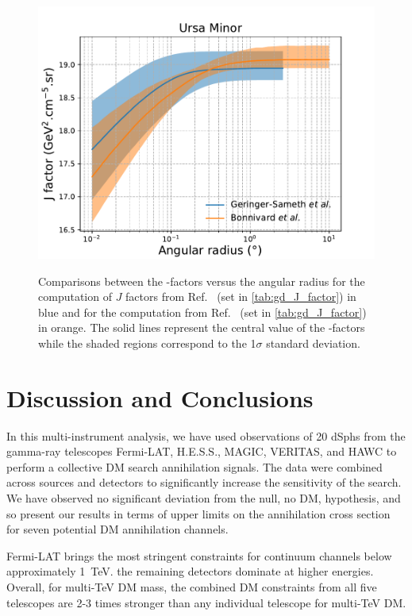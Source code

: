\begin{figure}[ht]
{    \includegraphics[scale=0.32]{figures/glory_duck/appendix/UrsaMinor.pdf}
}
    \caption{Comparisons between the \J-factors versus the angular radius for the computation of $J$ factors from Ref.~\cite{Geringer-Sameth:2014yza} (\GS set in \cref{tab:gd_J_factor}) in blue and for the computation from Ref.~\cite{Bonnivard:2014kza, Bonnivard:2015xpq} (\B set in \cref{tab:gd_J_factor}) in orange. The solid lines represent the central value of the \J-factors while the shaded regions correspond to the 1$\sigma$ standard deviation.}
\label{fig:comparison_J_2}
\end{figure}

\section{Discussion and Conclusions\label{sec:gd_conclusions}}

In this multi-instrument analysis, we have used observations of 20 dSphs from the gamma-ray telescopes Fermi-LAT, H.E.S.S., MAGIC, VERITAS, and HAWC to perform a collective DM search annihilation signals.
The data were combined across sources and detectors to significantly increase the sensitivity of the search.
We have observed no significant deviation from the null, no DM, hypothesis, and so present our results in terms of upper limits on the annihilation cross section for seven potential DM annihilation channels.

Fermi-LAT brings the most stringent constraints for continuum channels below approximately 1~TeV. the remaining detectors dominate at higher energies.
Overall, for multi-TeV DM mass, the combined DM constraints from all five telescopes are 2-3 times stronger than any individual telescope for multi-TeV DM.

